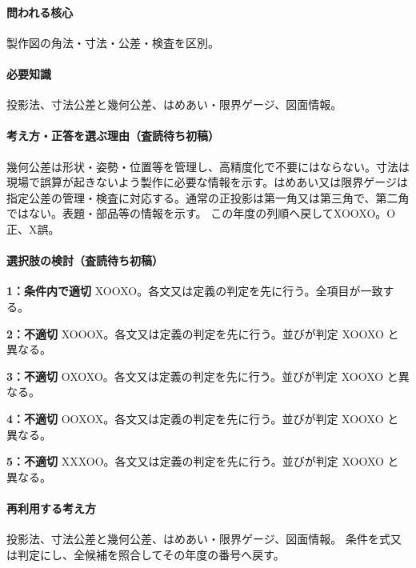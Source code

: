 \paragraph{問われる核心} 製作図の角法・寸法・公差・検査を区別。

\paragraph{必要知識} 投影法、寸法公差と幾何公差、はめあい・限界ゲージ、図面情報。

\paragraph{考え方・正答を選ぶ理由（査読待ち初稿）} 幾何公差は形状・姿勢・位置等を管理し、高精度化で不要にはならない。寸法は現場で誤算が起きないよう製作に必要な情報を示す。はめあい又は限界ゲージは指定公差の管理・検査に対応する。通常の正投影は第一角又は第三角で、第二角ではない。表題・部品等の情報を示す。 この年度の列順へ戻してXOOXO。O正、X誤。

\paragraph{選択肢の検討（査読待ち初稿）}\mbox{}\par

\noindent\textbf{1：条件内で適切} XOOXO。各文又は定義の判定を先に行う。全項目が一致する。\par

\noindent\textbf{2：不適切} XOOOX。各文又は定義の判定を先に行う。並びが判定 XOOXO と異なる。\par

\noindent\textbf{3：不適切} OXOXO。各文又は定義の判定を先に行う。並びが判定 XOOXO と異なる。\par

\noindent\textbf{4：不適切} OOXOX。各文又は定義の判定を先に行う。並びが判定 XOOXO と異なる。\par

\noindent\textbf{5：不適切} XXXOO。各文又は定義の判定を先に行う。並びが判定 XOOXO と異なる。\par

\paragraph{再利用する考え方} 投影法、寸法公差と幾何公差、はめあい・限界ゲージ、図面情報。 条件を式又は判定にし、全候補を照合してその年度の番号へ戻す。

